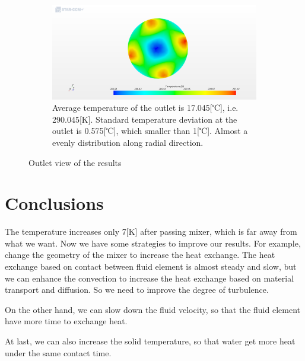 \documentclass[journal,article,submit,moreauthors,pdftex]{Definitions/mdpi}
\begin{document}
\begin{figure}
\begin{center}
\centering
\begin{subfigure}[b]{1.0\textwidth}
\includegraphics[width=\linewidth]{./docu_pictures/result3.png}
\caption*{Average temperature of the outlet is 17.045[℃], i.e. 290.045[K]. Standard temperature deviation at the outlet is 0.575[℃], which smaller than 1[℃]. Almost a evenly distribution along radial direction.}
\end{subfigure}
\end{center}
\caption{Outlet view of the results}
\label{outlet-result-pictures}
\end{figure}


\section{Conclusions}

The temperature increases only 7[K] after passing mixer, which is far away from what we want. Now we have some strategies to improve our results. For example, change the geometry of the mixer to increase the heat exchange. The heat exchange based on contact between fluid element is almost steady and slow, but we can enhance the convection to increase the heat exchange based on material transport and diffusion. So we need to improve the degree of turbulence. 

On the other hand, we can slow down the fluid velocity, so that the fluid element have more time to exchange heat. 

At last, we can also increase the solid temperature, so that water get more heat under the same contact time.

\vspace{6pt} 
\end{document}
